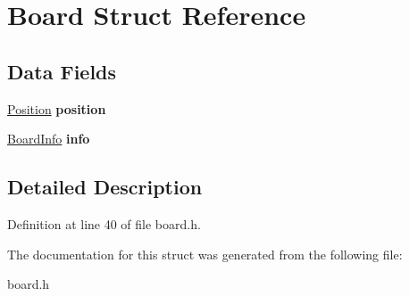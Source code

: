 \hypertarget{struct_board}{\section{Board Struct Reference}
\label{struct_board}
}
\subsection*{Data Fields}
\begin{DoxyCompactItemize}
\item 
\hypertarget{struct_board_a8d3072680d59dcaea406f2396d712a8b}{\hyperlink{struct_position}{Position} {\bfseries position}}\label{struct_board_a8d3072680d59dcaea406f2396d712a8b}

\item 
\hypertarget{struct_board_a20adb90475f5fb975f4d52a8f301ca2d}{\hyperlink{struct_board_info}{Board\-Info} {\bfseries info}}\label{struct_board_a20adb90475f5fb975f4d52a8f301ca2d}

\end{DoxyCompactItemize}


\subsection{Detailed Description}


Definition at line 40 of file board.\-h.



The documentation for this struct was generated from the following file\-:\begin{DoxyCompactItemize}
\item 
board.\-h\end{DoxyCompactItemize}
